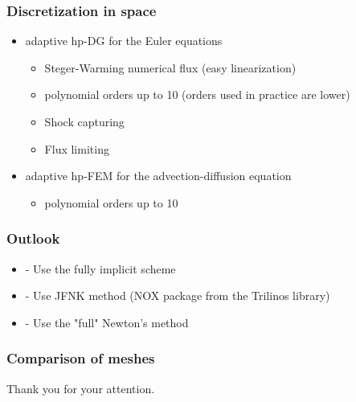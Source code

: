 \documentclass{beamer}
\begin{document}
\begin{frame}
\frametitle{Discretization in space}
\begin{itemize}
\item
adaptive hp-DG for the Euler equations
\begin{itemize}
\item Steger-Warming numerical flux (easy linearization) %
\item	
polynomial orders up to 10 (orders used in practice are lower)
\item
Shock capturing
\item
Flux limiting
\end{itemize}
\item
adaptive hp-FEM for the advection-diffusion equation
\begin{itemize}
\item
polynomial orders up to 10
\end{itemize}
\end{itemize}
\end{frame}



\begin{frame}
\frametitle{Outlook}
\begin{center}
\begin{itemize}
\item - Use the fully implicit scheme
\item - Use JFNK method (NOX package from the Trilinos library)
\item - Use the "full" Newton's method
\end{itemize}
\end{center}
\end{frame}


\begin{frame}
\frametitle{Comparison of meshes}
\begin{center}
\Large
Thank you for your attention.
\end{center}
\end{frame}
\end{document}
